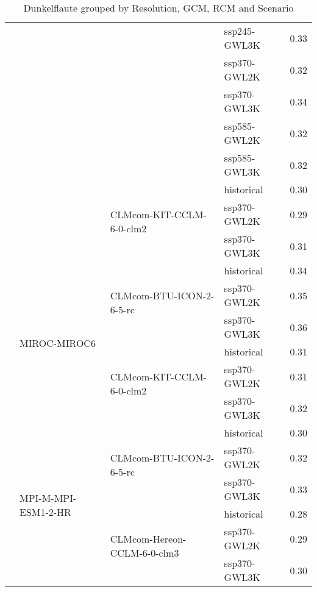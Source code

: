 \begin{table}[htbp]
{\begin{tabular}{lll|l|r}
 &  &  & ssp245-GWL3K & 0.33 \\
 &  &  & ssp370-GWL2K & 0.32 \\
 &  &  & ssp370-GWL3K & 0.34 \\
 &  &  & ssp585-GWL2K & 0.32 \\
 &  &  & ssp585-GWL3K & 0.32 \\
\cmidrule(lr){3-5}
 &  & \multirow{3}{*}{CLMcom-KIT-CCLM-6-0-clm2} & historical & 0.30 \\
 &  &  & ssp370-GWL2K & 0.29 \\
 &  &  & ssp370-GWL3K & 0.31 \\
\cmidrule(lr){3-5}
\cmidrule(lr){2-5}
 & \multirow{6}{*}{MIROC-MIROC6} & \multirow{3}{*}{CLMcom-BTU-ICON-2-6-5-rc} & historical & 0.34 \\
 &  &  & ssp370-GWL2K & 0.35 \\
 &  &  & ssp370-GWL3K & 0.36 \\
\cmidrule(lr){3-5}
 &  & \multirow{3}{*}{CLMcom-KIT-CCLM-6-0-clm2} & historical & 0.31 \\
 &  &  & ssp370-GWL2K & 0.31 \\
 &  &  & ssp370-GWL3K & 0.32 \\
\cmidrule(lr){3-5}
\cmidrule(lr){2-5}
 & \multirow{6}{*}{MPI-M-MPI-ESM1-2-HR} & \multirow{3}{*}{CLMcom-BTU-ICON-2-6-5-rc} & historical & 0.30 \\
 &  &  & ssp370-GWL2K & 0.32 \\
 &  &  & ssp370-GWL3K & 0.33 \\
\cmidrule(lr){3-5}
 &  & \multirow{3}{*}{CLMcom-Hereon-CCLM-6-0-clm3} & historical & 0.28 \\
 &  &  & ssp370-GWL2K & 0.29 \\
 &  &  & ssp370-GWL3K & 0.30 \\
\bottomrule
\end{tabular}
}
\label{Table:Dunkelflaute_changes}
\caption{Dunkelflaute grouped by Resolution, GCM, RCM and Scenario}
\end{table}
